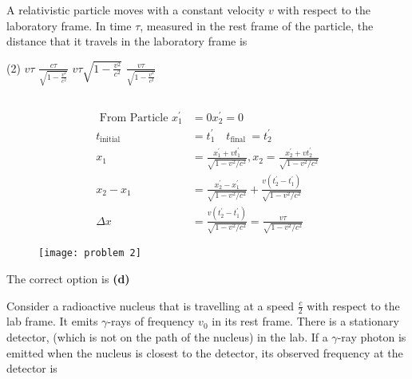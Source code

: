 \begin{enumerate}
\begin{answer}
\end{answer}
\begin{minipage}{\textwidth}
	\item A relativistic particle moves with a constant velocity $v$ with respect to the laboratory frame. In time $\tau$, measured in the rest frame of the particle, the distance that it travels in the laboratory frame is
\end{minipage}
\begin{tasks}(2)
	\task[\textbf{A.}] $v \tau$
	\task[\textbf{B.}]$\frac{c \tau}{\sqrt{1-\frac{v^{2}}{c^{2}}}}$
	\task[\textbf{C.}]$v \tau \sqrt{1-\frac{v^{2}}{c^{2}}}$
	\task[\textbf{D.}]$\frac{v \tau}{\sqrt{1-\frac{v^{2}}{c^{2}}}}$
\end{tasks}
\begin{answer}$\left. \right. $\\
	\begin{minipage}{0.5\textwidth}
	\begin{align*}
	\text { From Particle } x_{1}^{\prime}&=0 x_{2}^{\prime}=0\\
	t_{\text {initial }}&=t_{1}^{\prime} \quad t_{\text {final }}=t_{2}^{\prime}\\
	x_{1}&=\frac{x_{1}^{\prime}+v t_{1}^{\prime}}{\sqrt{1-v^{2} / c^{2}}}, x_{2}=\frac{x_{2}^{\prime}+v t_{2}^{\prime}}{\sqrt{1-v^{2} / c^{2}}}\\
	x_{2}-x_{1}&=\frac{x_{2}^{\prime}-x_{1}^{\prime}}{\sqrt{1-v^{2} / c^{2}}}+\frac{v\left(t_{2}^{\prime}-t_{1}^{\prime}\right)}{\sqrt{1-v^{2} / c^{2}}}\\
	\Delta x&=\frac{v\left(t_{2}^{\prime}-t_{1}^{\prime}\right)}{\sqrt{1-v^{2} / c^{2}}}=\frac{v \tau}{\sqrt{1-v^{2} / c^{2}}}
	\end{align*}	
	\end{minipage}
\begin{minipage}{0.5\textwidth}
	\begin{figure}[H]
		\centering
		\texttt{[image: problem 2]}
	\end{figure}
\end{minipage}
The correct option is \textbf{(d)}
\end{answer}
\begin{minipage}{\textwidth}
	\item Consider a radioactive nucleus that is travelling at a speed $\frac{c}{2}$ with respect to the lab frame. It emits $\gamma$-rays of frequency $v_{0}$ in its rest frame. There is a stationary detector, (which is not on the path of the nucleus) in the lab. If a $\gamma$-ray photon is emitted when the nucleus is closest to the detector, its observed frequency at the detector is

\end{minipage}
\end{enumerate}
